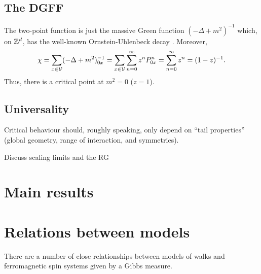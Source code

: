
\subsection{The DGFF}

The two-point function is just the massive Green function
$(-\Delta + m^2)^{-1}$ which, on ${ {{\mathbb Z}}^d }$, has the well-known Ornstein-Uhlenbeck decay . Moreover,
\begin{equation}
\chi
  =
\sum_{x\in\mathcal{V}} (-\Delta + m^2)^{-1}_{0x}
  =
\sum_{x\in\mathcal{V}} \sum_{n=0}^\infty z^n P^n_{0x}
  =
\sum_{n=0}^\infty z^n
  =
(1 - z)^{-1}.
\end{equation}
Thus, there is a critical point at $m^2 = 0$ ($z = 1$).




\subsection{Universality}

Critical behaviour should, roughly speaking, only depend on ``tail properties''
(global geometry, range of interaction, and symmetries).

Discuss scaling limits and the RG


\section{Main results}


\section{Relations between models}

There are a number of close relationships between models of walks and ferromagnetic spin
systems given by a Gibbs measure.

